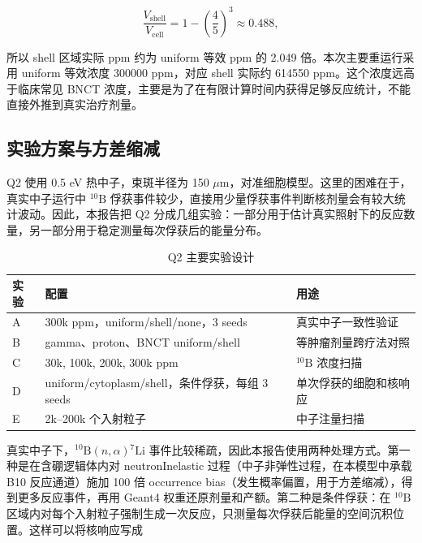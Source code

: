 \documentclass[12pt,hyperref,a4paper,UTF8,fontset=fandol]{ctexart}
\begin{document}
\begin{equation}
    \frac{V_{\mathrm{shell}}}{V_{\mathrm{cell}}}
    = 1-\left(\frac{4}{5}\right)^3
    \approx 0.488,
\end{equation}

所以 shell 区域实际 ppm 约为 uniform 等效 ppm 的 2.049 倍。本次主要重运行采用 uniform 等效浓度 300000 ppm，对应 shell 实际约 614550 ppm。这个浓度远高于临床常见 BNCT 浓度，主要是为了在有限计算时间内获得足够反应统计，不能直接外推到真实治疗剂量。

\subsection{实验方案与方差缩减}

Q2 使用 0.5 eV 热中子，束斑半径为 150 $\mu$m，对准细胞模型。这里的困难在于，真实中子运行中 $^{10}\mathrm{B}$ 俘获事件较少，直接用少量俘获事件判断核剂量会有较大统计波动。因此，本报告把 Q2 分成几组实验：一部分用于估计真实照射下的反应数量，另一部分用于稳定测量每次俘获后的能量分布。

\begin{table}[H]
    \centering
    \caption{Q2 主要实验设计}
    \label{tab:q2-design}
    \small
    \begin{tabularx}{\textwidth}{>{\raggedright\arraybackslash}p{1.0cm}>{\raggedright\arraybackslash}X>{\raggedright\arraybackslash}p{3.2cm}}
        \toprule
        实验 & 配置 & 用途 \\
        \midrule
        A & 300k ppm，uniform/shell/none，3 seeds & 真实中子一致性验证 \\
        B & gamma、proton、BNCT uniform/shell & 等肿瘤剂量跨疗法对照 \\
        C & 30k, 100k, 200k, 300k ppm & $^{10}\mathrm{B}$ 浓度扫描 \\
        D & uniform/cytoplasm/shell，条件俘获，每组 3 seeds & 单次俘获的细胞和核响应 \\
        E & 2k--200k 个入射粒子 & 中子注量扫描 \\
        \bottomrule
    \end{tabularx}
\end{table}

真实中子下，$^{10}\mathrm{B}(n,\alpha){}^{7}\mathrm{Li}$ 事件比较稀疏，因此本报告使用两种处理方式。第一种是在含硼逻辑体内对 neutronInelastic 过程（中子非弹性过程，在本模型中承载 B10 反应通道）施加 100 倍 occurrence bias（发生概率偏置，用于方差缩减），得到更多反应事件，再用 Geant4 权重还原剂量和产额。第二种是条件俘获：在 $^{10}\mathrm{B}$ 区域内对每个入射粒子强制生成一次反应，只测量每次俘获后能量的空间沉积位置。这样可以将核响应写成
\end{document}
